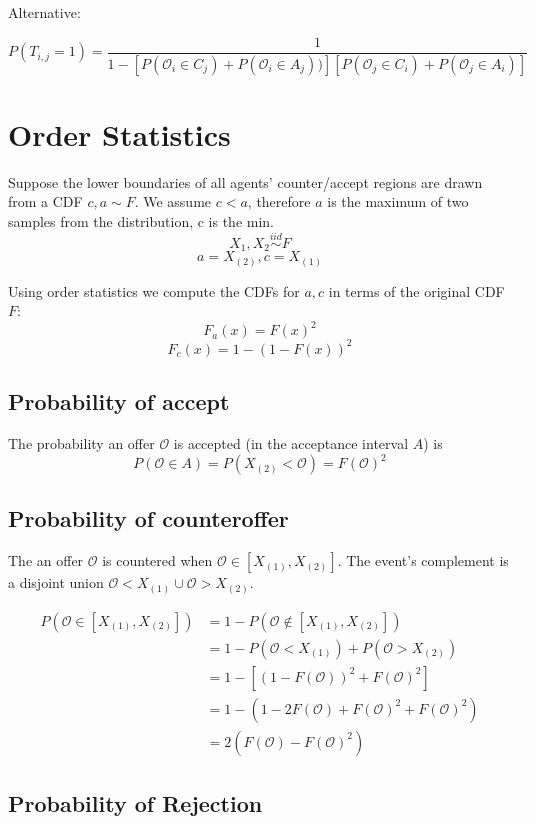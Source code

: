 \documentclass{article}
\begin{document}
Alternative:
\newcommand{\offer}{\mathcal{O}}

$$P(T_{i,j} = 1) = \frac{1}{1 - \left[P(\offer_i \in C_j) + P(\offer_i \in A_j))\right]\left[P(\offer_j \in C_i) + P(\offer_j \in A_i)\right]}$$

\section{Order Statistics}

Suppose the lower boundaries of all agents' counter/accept regions are drawn from a CDF $c, a \sim F$. We assume $c < a$, therefore $a$ is the maximum of two samples from the distribution, c is the min. 
$$X_1, X_2 \stackrel{iid}{\sim} F$$
$$a = X_{(2)}, c = X_{(1)}$$

Using order statistics we compute the CDFs for $a, c$ in terms of the original CDF $F$:
$$F_{a}(x) = F(x)^2$$
$$F_c(x) = 1 - (1 - F(x))^2$$

\subsection{Probability of accept}
The probability an offer $\offer$ is accepted (in the acceptance interval $A$) is
$$P(\offer \in A) = P(X_{(2)} < \offer) = F(\offer)^2$$

\subsection{Probability of counteroffer}

The an offer $\offer$ is countered when $\offer \in [X_{(1)}, X_{(2)}]$. The event's complement is a disjoint union $\offer < X_{(1)} \cup \offer > X_{(2)}$. 

\begin{align*}
    P(\offer \in [X_{(1)}, X_{(2)}]) &= 1 - P(\offer \not\in [X_{(1)}, X_{(2)}])\\
    &= 1 - P(\offer < X_{(1)}) + P(\offer > X_{(2)}) \\
    &= 1 - \left[(1 - F(\offer))^2 + F(\offer)^2\right] \\
    &= 1 - (1 - 2F(\offer) + F(\offer)^2 + F(\offer)^2)\\
    &= 2(F(\offer) - F(\offer)^2)
\end{align*}

\subsection{Probability of Rejection}
\end{document}
